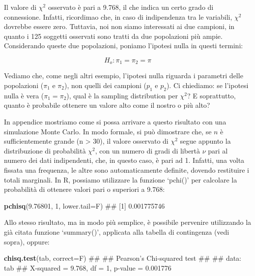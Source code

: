 \documentclass[a4paper,12pt,oneside]{book}
\newenvironment{Shaded}{\begin{snugshade}}{\end{snugshade}}
\newcommand{\KeywordTok}[1]{\textcolor[rgb]{0.13,0.29,0.53}{\textbf{#1}}}
\newcommand{\DataTypeTok}[1]{\textcolor[rgb]{0.13,0.29,0.53}{#1}}
\newcommand{\DecValTok}[1]{\textcolor[rgb]{0.00,0.00,0.81}{#1}}
\newcommand{\FloatTok}[1]{\textcolor[rgb]{0.00,0.00,0.81}{#1}}
\newcommand{\NormalTok}[1]{#1}
\theoremstyle{definition}
\theoremstyle{definition}
\theoremstyle{definition}
\theoremstyle{remark}
\begin{document}
Il valore di \(\chi^2\) osservato è pari a 9.768, il che indica un certo
grado di connessione. Infatti, ricordimao che, in caso di indipendenza
tra le variabili, \(\chi^2\) dovrebbe essere zero. Tuttavia, noi non
siamo interessati ai due campioni, in quanto i 125 soggetti osservati
sono tratti da due popolazioni più ampie. Considerando queste due
popolazioni, poniamo l'ipotesi nulla in questi termini:

\[H_o :\pi_1  = \pi_2  = \pi\]

Vediamo che, come negli altri esempio, l'ipotesi nulla riguarda i
parametri delle popolazioni (\(\pi_1\) e \(\pi_2\)), non quelli dei
campioni (\(p_1\) e \(p_2\)). Ci chiediamo: se l'ipotesi nulla è vera
(\(\pi_1 = \pi_2\)), qual è la sampling distribution per \(\chi^2\)? E
soprattutto, quanto è probabile ottenere un valore alto come il nostro o
più alto?

In appendice mostriamo come si possa arrivare a questo risultato con una
simulazione Monte Carlo. In modo formale, si può dimostrare che, se
\(n\) è sufficientemente grande (n \textgreater{} 30), il valore
osservato di \(\chi^2\) segue appunto la distribuzione di probabilità
\(\chi^2\), con un numero di gradi di libertà \(\nu\) pari al numero dei
dati indipendenti, che, in questo caso, è pari ad 1. Infatti, una volta
fissata una frequenza, le altre sono automaticamente definite, dovendo
restituire i totali marginali. In R, possiamo utilizzare la funzione
`pchi()' per calcolare la probabilità di ottenere valori pari o
superiori a 9.768:

\begin{Shaded}
\begin{Highlighting}[]
\KeywordTok{pchisq}\NormalTok{(}\FloatTok{9.76801}\NormalTok{, }\DecValTok{1}\NormalTok{, }\DataTypeTok{lower.tail=}\NormalTok{F)}
\NormalTok{## [1] 0.001775746}
\end{Highlighting}
\end{Shaded}

Allo stesso risultato, ma in modo più semplice, è possibile pervenire
utilizzando la già citata funzione `summary()', applicata alla tabella
di contingenza (vedi sopra), oppure:

\begin{Shaded}
\begin{Highlighting}[]
\KeywordTok{chisq.test}\NormalTok{(tab, }\DataTypeTok{correct=}\NormalTok{F)}
\NormalTok{## }
\NormalTok{##  Pearson's Chi-squared test}
\NormalTok{## }
\NormalTok{## data:  tab}
\NormalTok{## X-squared = 9.768, df = 1, p-value = 0.001776}
\end{Highlighting}
\end{Shaded}
\end{document}
